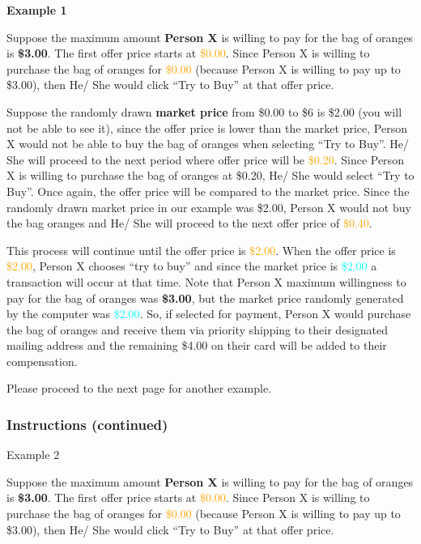 \documentclass[12pt]{article}
\begin{document}
{\textbf{Example 1}

Suppose the maximum amount \textbf{Person X} is willing to pay for the bag of oranges is \textbf{\$3.00}. The first offer price starts at \textcolor{orange}{\$0.00}. Since Person X is willing to purchase the bag of oranges for \textcolor{orange}{\$0.00} (because Person X is willing to pay up to \$3.00), then He/ She would click “Try to Buy” at that offer price.

Suppose the randomly drawn \textbf{market price} from \$0.00 to \$6 is \$2.00 (you will not be able to see it), since the offer price is lower than the market price, Person X would not be able to buy the bag of oranges when selecting “Try to Buy”. He/ She will proceed to the next period where offer price will be \textcolor{orange}{\$0.20}.
Since Person X is willing to purchase the bag of oranges at \$0.20, He/ She would select “Try to Buy”. Once again, the offer price will be compared to the market price. Since the randomly drawn market price in our example was \$2.00, Person X would not buy the bag oranges and He/ She will proceed to the next offer price of \textcolor{orange}{\$0.40}.


This process will continue until the offer price is \textcolor{orange}{\$2.00}. When the offer price is \textcolor{orange}{\$2.00}, Person X chooses “try to buy” and since the market price is \textcolor{cyan}{\$2.00} a transaction will occur at that time. Note that Person X maximum willingness to pay for the bag of oranges was \textbf{\$3.00}, but the market price randomly generated by the computer was \textcolor{cyan}{\$2.00}. So, if selected for payment, Person X would purchase the bag of oranges and receive them via priority shipping to their designated mailing address and the remaining \$4.00 on their card will be added to their compensation.



Please proceed to the next page for another example.
\clearpage

\subsubsection*{\textbf{Instructions (continued)}}

Example 2

Suppose the maximum amount \textbf{Person X} is willing to pay for the bag of oranges is \textbf{\$3.00}. The first offer price starts at \textcolor{orange}{\$0.00}. Since Person X is willing to purchase the bag of oranges for \textcolor{orange}{\$0.00} (because Person X is willing to pay up to \$3.00), then He/ She would click “Try to Buy” at that offer price.

}
\end{document}
